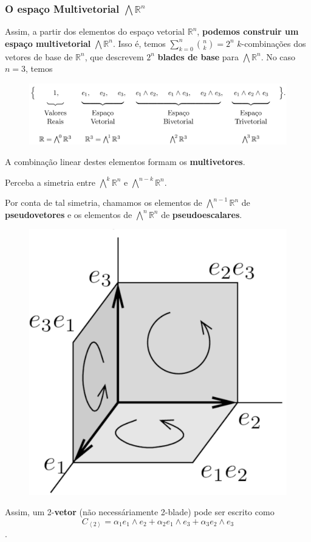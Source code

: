 \documentclass[10pt]{beamer}
\theoremstyle{plain}
\theoremstyle{definition}
\begin{document}
	\begin{frame}
		\frametitle{O espaço Multivetorial $\bigwedge \mathbb{R}^n$}
		Assim, a partir dos elementos do espaço vetorial $\mathbb{R}^n$, \textbf{podemos construir um espaço multivetorial} $\bigwedge\mathbb{R}^n$. Isso é, temos $\sum_{k=0}^{n} {n\choose k} = 2^n$ $k$-combinações dos vetores de base de $\mathbb{R}^n$, que descrevem $2^n$ \textbf{blades de base} para $\bigwedge\mathbb{R}^n$. No caso $n =3$, temos
		
		\begin{figure}[H]
			\includegraphics[width=0.8\linewidth]{figures/wr3.png}
		\end{figure}
		
		A combinação linear destes elementos formam os \textbf{multivetores}.
		\vspace{0.2cm}
		
		\begin{minipage}{0.68\linewidth}
			Perceba a simetria entre $\bigwedge^k\mathbb{R}^n$ e $\bigwedge^{n-k}\mathbb{R}^n$.
			
			Por conta de tal simetria, chamamos os elementos de $\bigwedge^{n-1}\mathbb{R}^n$ de \textbf{pseudovetores} e os elementos de $\bigwedge^{n}\mathbb{R}^n$ de \textbf{pseudoescalares}.	
		\end{minipage}
		\vspace{-2.4cm}
		\begin{figure}[H]
			\hspace{9cm}
			\includegraphics[width=0.2\linewidth]{figures/bivectorsBase.pdf}
		\end{figure}
		\vspace{-0.2cm}
		Assim, um 2-\textbf{vetor} (não necessáriamente 2-blade) pode ser escrito como \vspace{-0.18cm}$$C_{\left < 2\right >} = \alpha_1 e_1\wedge e_2 + \alpha_2 e_1 \wedge e_3 + \alpha_3 e_2 \wedge e_3$$. 
	\end{frame}
\end{document}

